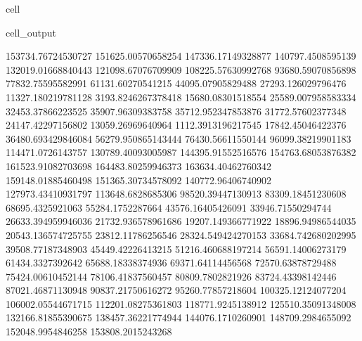 \documentclass[letterpaper,10pt,english]{jupyterBook}
\begin{document}
\begin{sphinxuseclass}{cell}
\begin{sphinxVerbatimOutput}
\begin{sphinxuseclass}{cell_output}
\begin{sphinxVerbatim}[commandchars=\\\{\}]
153734.76724530727  151625.00570658254  147336.17149328877  140797.4508595139  132019.01668840443  121098.67076709909  108225.57630992768  93680.59070856898  77832.75595582991  61131.60270541215  44095.07905829488  27293.126029796476  11327.180219781128  \PYGZhy{}3193.8246267378418  \PYGZhy{}15680.08301518554  \PYGZhy{}25589.007958583334  \PYGZhy{}32453.37866223525  \PYGZhy{}35907.96309383758  \PYGZhy{}35712.952347853876  \PYGZhy{}31772.57602377348  \PYGZhy{}24147.42297156802  \PYGZhy{}13059.26969640964  1112.3913196217545  17842.45046422376  36480.693429846084  56279.950865143444  76430.56611550144  96099.38219901183  114471.0726143757  130789.40093005987  144395.91552516576  154763.68053876382  161523.91082703698  164483.80259946373  163634.40462760342  159148.01885460498  151365.30734578092  140772.96406740902  127973.43410931797  113648.6828685306  98520.39447130913  83309.18451230608  68695.4325921063  55284.1752287664  43576.16405426091  33946.71550294744  26633.394959946036  21732.936578961686  19207.149366771922  18896.94986544035  20543.136574725755  23812.11786256546  28324.549424270153  33684.742680202995  39508.77187348903  45449.42226413215  51216.460688197214  56591.14006273179  61434.3327392642  65688.18338374936  69371.64114456568  72570.63878729488  75424.00610452144  78106.41837560457  80809.7802821926  83724.43398142446  87021.46871130948  90837.21750616272  95260.77857218604  100325.12124077204  106002.05544671715  112201.08275361803  118771.9245138912  125510.35091348008  132166.81855390675  138457.36221774944  144076.1710260901  148709.2984655092  152048.9954846258  153808.2015243268  

\end{sphinxVerbatim}
\end{sphinxuseclass}
\end{sphinxVerbatimOutput}
\end{sphinxuseclass}
\end{document}
